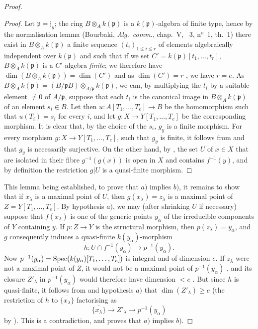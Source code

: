 \begin{proof}
\begin{proof}
Let $\mathfrak{p}=\mathfrak{j}_y$; the ring $B\otimes_A k(\mathfrak{p})$ is a $k(\mathfrak{p})$-algebra of finite type, hence by the normalisation lemma (Bourbaki, \emph{Alg.\ comm.}, chap.~V, \textsection~3, n$^{\text{o}}$~1, th.~1) there exist in $B\otimes_A k(\mathfrak{p})$ a finite sequence $(t_i)_{1\leq i\leq r}$ of elements algebraically independent over $k(\mathfrak{p})$ and such that if we set $C'=k(\mathfrak{p})[t_1,\ldots,t_r]$, $B\otimes_A k(\mathfrak{p})$ is a $C'$-algebra \emph{finite}; we therefore have $\dim(B\otimes_A k(\mathfrak{p}))=\dim(C')$  and as $\dim(C')=r$ , we have $r=e$.
As $B\otimes_A k(\mathfrak{p})=(B/\mathfrak{p}B)\otimes_{A/\mathfrak{p}}k(\mathfrak{p})$, we can, by multiplying the $t_i$ by a suitable element $\neq0$
of $A/\mathfrak{p}$, suppose that each $t_i$ is the canonical image in $B\otimes_A k(\mathfrak{p})$ of an element $s_i\in B$.
Let then $u:A[T_1,\ldots,T_e]\to B$ be the homomorphism such that $u(T_i)=s_i$ for every $i$, and let $g:X\to Y[T_1,\ldots,T_e]$ be the corresponding morphism.
It is clear that, by the choice of the $s_i$, $g_y$ is a finite morphism.
For every morphism $g:X\to Y[T_1,\ldots,T_e]$, such that $g_y$ is finite, it follows from  and  that $g_y$ is necessarily surjective.
On the other hand, by , the set $U$ of $x\in X$ that are isolated in their fibre $g^{-1}(g(x))$ is open in $X$ and contains $f^{-1}(y)$, and by definition the restriction $g|U$ is a quasi-finite morphism.
\end{proof}

This lemma being established, to prove that $a)$ implies $b)$, it remains to show that if $x_\lambda$ is a maximal point of $U$, then $g(x_\lambda)=z_\lambda$ is a maximal point of $Z=Y[T_1,\ldots,T_e]$.
By hypothesis $a)$, we may (after shrinking $U$ if necessary) suppose that $f(x_\lambda)$ is one of the generic points $y_\alpha$ of the irreducible components of $Y$ containing $y$. If $p:Z\to Y$ is the structural morphism, then $p(z_\lambda)=y_\alpha$, and $g$ consequently induces a quasi-finite $k(y_\alpha)$-morphism
\[
h:U\cap f^{-1}(y_\alpha)\longrightarrow p^{-1}(y_\alpha).
\]
Now $p^{-1}(y_\alpha)=\operatorname{Spec}(k(y_\alpha)[T_1,\ldots,T_e])$ is integral and of dimension $e$. If $z_\lambda$ were not a maximal point of $Z$, it would not be a maximal point of $p^{-1}(y_\alpha)$ , and its closure $Z'_\lambda$ in $p^{-1}(y_\alpha)$ would therefore have dimension $<e$ . But since $h$ is quasi-finite, it follows from  and hypothesis $a)$ that $\dim(Z'_\lambda)\geq e$ (the restriction of $h$ to $\overline{\{x_\lambda\}}$ factorising as
\[
\overline{\{x_\lambda\}}\longrightarrow Z'_\lambda\longrightarrow p^{-1}(y_\alpha)
\]
by ). This is a contradiction, and proves that $a)$ implies $b)$.


\end{proof}

